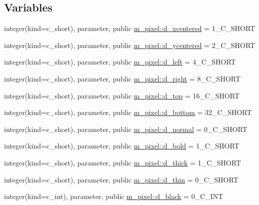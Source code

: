 \subsection*{Variables}
\begin{DoxyCompactItemize}
\item 
integer(kind=c\+\_\+short), parameter, public \mbox{\hyperlink{namespacem__pixel_a17836179f5929a8ec95a2a08da282895}{m\+\_\+pixel\+::d\+\_\+xcentered}} = 1\+\_\+\+C\+\_\+\+S\+H\+O\+RT
\item 
integer(kind=c\+\_\+short), parameter, public \mbox{\hyperlink{namespacem__pixel_ad6fa62e363bd143fa3e276622d899cf2}{m\+\_\+pixel\+::d\+\_\+ycentered}} = 2\+\_\+\+C\+\_\+\+S\+H\+O\+RT
\item 
integer(kind=c\+\_\+short), parameter, public \mbox{\hyperlink{namespacem__pixel_a5d72b48383d8405bcc75147cf6a8999c}{m\+\_\+pixel\+::d\+\_\+left}} = 4\+\_\+\+C\+\_\+\+S\+H\+O\+RT
\item 
integer(kind=c\+\_\+short), parameter, public \mbox{\hyperlink{namespacem__pixel_abdd69f206e03c992f74bc38fdbdc5341}{m\+\_\+pixel\+::d\+\_\+right}} = 8\+\_\+\+C\+\_\+\+S\+H\+O\+RT
\item 
integer(kind=c\+\_\+short), parameter, public \mbox{\hyperlink{namespacem__pixel_adddde832c6f969c69644b065fd80b9c5}{m\+\_\+pixel\+::d\+\_\+top}} = 16\+\_\+\+C\+\_\+\+S\+H\+O\+RT
\item 
integer(kind=c\+\_\+short), parameter, public \mbox{\hyperlink{namespacem__pixel_ae996d01c0e74fed7a7dc923f2fce3f0a}{m\+\_\+pixel\+::d\+\_\+bottom}} = 32\+\_\+\+C\+\_\+\+S\+H\+O\+RT
\item 
integer(kind=c\+\_\+short), parameter, public \mbox{\hyperlink{namespacem__pixel_a9a55ef644fd7b8d4c11edddecadd5cd9}{m\+\_\+pixel\+::d\+\_\+normal}} = 0\+\_\+\+C\+\_\+\+S\+H\+O\+RT
\item 
integer(kind=c\+\_\+short), parameter, public \mbox{\hyperlink{namespacem__pixel_a19f01bd571c0cf1d8a1cbb3f7d43bfae}{m\+\_\+pixel\+::d\+\_\+bold}} = 1\+\_\+\+C\+\_\+\+S\+H\+O\+RT
\item 
integer(kind=c\+\_\+short), parameter, public \mbox{\hyperlink{namespacem__pixel_a095fd528e2868919dfc3711aa1fea54d}{m\+\_\+pixel\+::d\+\_\+thick}} = 1\+\_\+\+C\+\_\+\+S\+H\+O\+RT
\item 
integer(kind=c\+\_\+short), parameter, public \mbox{\hyperlink{namespacem__pixel_acc98e97d1c60df778c0d4035653d24c8}{m\+\_\+pixel\+::d\+\_\+thin}} = 0\+\_\+\+C\+\_\+\+S\+H\+O\+RT
\item 
integer(kind=c\+\_\+int), parameter, public \mbox{\hyperlink{namespacem__pixel_a6f1238ade91dacb2d8c24ac393f2f8f4}{m\+\_\+pixel\+::d\+\_\+black}} = 0\+\_\+\+C\+\_\+\+I\+NT

\end{DoxyCompactItemize}
